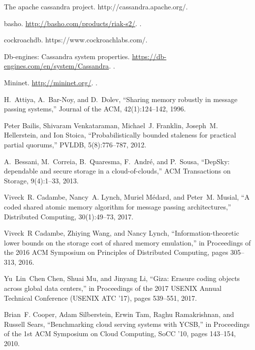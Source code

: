 \begin{thebibliography}{00}

The apache cassandra project.
\newblock http://cassandra.apache.org/.

basho.
\newblock \url{http://basho.com/products/riak-s2/}.
.

cockroachdb.
\newblock https://www.cockroachlabs.com/.

Db-engines: Cassandra system properties.
\newblock \url{https://db-engines.com/en/system/Cassandra}.
.

Mininet.
\newblock \url{http://mininet.org/}.
.

H.~Attiya, A.~Bar-Noy, and D.~Dolev,
``Sharing memory robustly in message passing systems,''
Journal of the ACM, 42(1):124--142, 1996.

Peter Bailis, Shivaram Venkataraman, Michael~J. Franklin, Joseph~M.
  Hellerstein, and Ion Stoica,
``Probabilistically bounded staleness for practical partial quorums,''
PVLDB, 5(8):776--787, 2012.

A.~Bessani, M.~Correia, B.~Quaresma, F.~Andr{\'e}, and P.~Sousa,
``{D}ep{S}ky: dependable and secure storage in a cloud-of-clouds,''
ACM {T}ransactions on Storage, 9(4):1--33, 2013.

Viveck~R. Cadambe, Nancy~A. Lynch, Muriel M{\'{e}}dard, and Peter~M. Musial,
``A coded shared atomic memory algorithm for message passing
  architectures,''
Distributed Computing, 30(1):49--73, 2017.

Viveck~R Cadambe, Zhiying Wang, and Nancy Lynch,
``Information-theoretic lower bounds on the storage cost of shared
  memory emulation,''
in Proceedings of the 2016 ACM Symposium on Principles of
  Distributed Computing, pages 305--313, 2016.

Yu~Lin~Chen Chen, Shuai Mu, and Jinyang Li,
``Giza: Erasure coding objects across global data centers,''
in Proceedings of the 2017 USENIX Annual Technical Conference
  (USENIX ATC ’17), pages 539--551, 2017.

Brian~F. Cooper, Adam Silberstein, Erwin Tam, Raghu Ramakrishnan, and Russell Sears,
``Benchmarking cloud serving systems with YCSB,''
in Proceedings of the 1st ACM Symposium on Cloud Computing,
  SoCC '10, pages 143--154, 2010.


\end{thebibliography}
